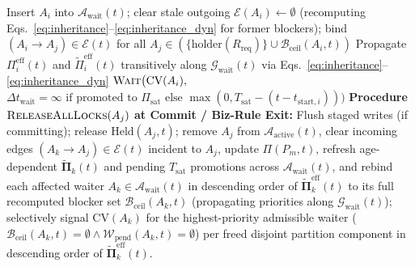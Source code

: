 \documentclass[conference,10pt]{IEEEtran}
\begin{document}
\begin{algorithm}[t]
\begin{algorithmic}[1]
    \ENDIF
    \STATE Insert $A_i$ into $\mathcal{A}_{\text{wait}}(t)$; clear stale outgoing $\mathcal{E}(A_i) \leftarrow \emptyset$ (recomputing Eqs.~\eqref{eq:inheritance}--\eqref{eq:inheritance_dyn} for former blockers); bind $(A_i \to A_j) \in \mathcal{E}(t)$ for all $A_j \in (\{\text{holder}(R_{\text{req}})\} \cup \mathcal{B}_{\text{ceil}}(A_i, t))$
    \STATE Propagate $\Pi_i^{\text{eff}}(t)$ and $\tilde{\Pi}_i^{\text{eff}}(t)$ transitively along $\mathcal{G}_{\text{wait}}(t)$ via Eqs.~\eqref{eq:inheritance}--\eqref{eq:inheritance_dyn}
    \STATE $\textsc{Wait}\big(\text{CV}(A_i),$ $\Delta t_{\text{wait}} = \infty \text{ if promoted to } \Pi_{\text{sat}} \text{ else } \max(0, T_{\text{sat}} - (t - t_{\text{start},i}))\big)$
\ENDLOOP
\STATE \textbf{Procedure} $\textsc{ReleaseAllLocks}(A_j)$ \textbf{at Commit / Biz-Rule Exit:}
\STATE Flush staged writes (if committing); release $\text{Held}(A_j, t)$; remove $A_j$ from $\mathcal{A}_{\text{active}}(t)$, clear incoming edges $(A_k \to A_j) \in \mathcal{E}(t)$ incident to $A_j$, update $\Pi(P_m, t)$, refresh age-dependent $\tilde{\mathbf{\Pi}}_k(t)$ and pending $T_{\text{sat}}$ promotions across $\mathcal{A}_{\text{wait}}(t)$, and rebind each affected waiter $A_k \in \mathcal{A}_{\text{wait}}(t)$ in descending order of $\tilde{\mathbf{\Pi}}_k^{\text{eff}}(t)$ to its full recomputed blocker set $\mathcal{B}_{\text{ceil}}(A_k, t)$ (propagating priorities along $\mathcal{G}_{\text{wait}}(t)$); selectively signal $\text{CV}(A_k)$ for the highest-priority admissible waiter ($\mathcal{B}_{\text{ceil}}(A_k, t)=\emptyset \land \mathcal{W}_{\text{pend}}(A_k, t)=\emptyset$) per freed disjoint partition component in descending order of $\tilde{\mathbf{\Pi}}_k^{\text{eff}}(t)$.
\end{algorithmic}
\end{algorithm}
\end{document}
